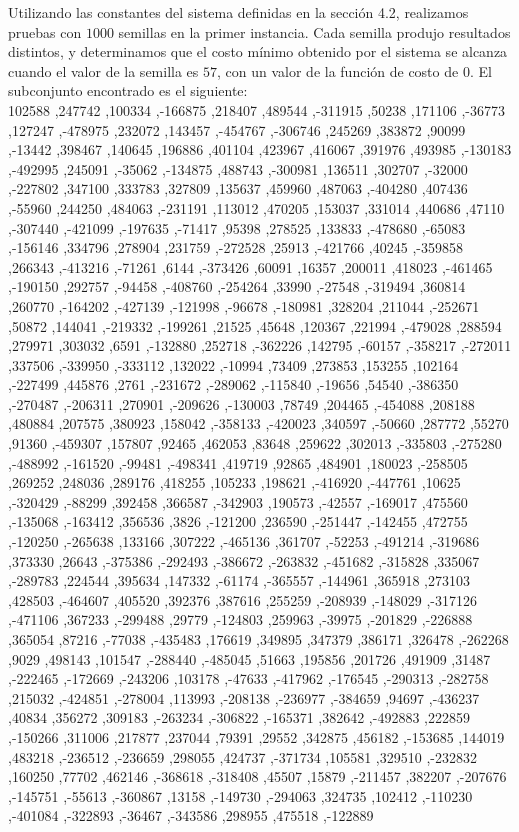 \documentclass[spanish,12pt,letterpaper]{article}
\begin{document}
	Utilizando las constantes del sistema definidas en la sección 4.2, realizamos pruebas con $1000$ semillas en la primer instancia. Cada semilla produjo resultados distintos, y determinamos que el costo mínimo obtenido por el sistema se alcanza cuando el valor de la semilla es $57$, con un valor de la función de costo de $0$. El subconjunto encontrado es el siguiente: \\
	
	102588 ,247742 ,100334 ,-166875 ,218407 ,489544 ,-311915 ,50238 ,171106 ,-36773 ,127247 ,-478975 ,232072 ,143457 ,-454767 ,-306746 ,245269 ,383872 ,90099 ,-13442 ,398467 ,140645 ,196886 ,401104 ,423967 ,416067 ,391976 ,493985 ,-130183 ,-492995 ,245091 ,-35062 ,-134875 ,488743 ,-300981 ,136511 ,302707 ,-32000 ,-227802 ,347100 ,333783 ,327809 ,135637 ,459960 ,487063 ,-404280 ,407436 ,-55960 ,244250 ,484063 ,-231191 ,113012 ,470205 ,153037 ,331014 ,440686 ,47110 ,-307440 ,-421099 ,-197635 ,-71417 ,95398 ,278525 ,133833 ,-478680 ,-65083 ,-156146 ,334796 ,278904 ,231759 ,-272528 ,25913 ,-421766 ,40245 ,-359858 ,266343 ,-413216 ,-71261 ,6144 ,-373426 ,60091 ,16357 ,200011 ,418023 ,-461465 ,-190150 ,292757 ,-94458 ,-408760 ,-254264 ,33990 ,-27548 ,-319494 ,360814 ,260770 ,-164202 ,-427139 ,-121998 ,-96678 ,-180981 ,328204 ,211044 ,-252671 ,50872 ,144041 ,-219332 ,-199261 ,21525 ,45648 ,120367 ,221994 ,-479028 ,288594 ,279971 ,303032 ,6591 ,-132880 ,252718 ,-362226 ,142795 ,-60157 ,-358217 ,-272011 ,337506 ,-339950 ,-333112 ,132022 ,-10994 ,73409 ,273853 ,153255 ,102164 ,-227499 ,445876 ,2761 ,-231672 ,-289062 ,-115840 ,-19656 ,54540 ,-386350 ,-270487 ,-206311 ,270901 ,-209626 ,-130003 ,78749 ,204465 ,-454088 ,208188 ,480884 ,207575 ,380923 ,158042 ,-358133 ,-420023 ,340597 ,-50660 ,287772 ,55270 ,91360 ,-459307 ,157807 ,92465 ,462053 ,83648 ,259622 ,302013 ,-335803 ,-275280 ,-488992 ,-161520 ,-99481 ,-498341 ,419719 ,92865 ,484901 ,180023 ,-258505 ,269252 ,248036 ,289176 ,418255 ,105233 ,198621 ,-416920 ,-447761 ,10625 ,-320429 ,-88299 ,392458 ,366587 ,-342903 ,190573 ,-42557 ,-169017 ,475560 ,-135068 ,-163412 ,356536 ,3826 ,-121200 ,236590 ,-251447 ,-142455 ,472755 ,-120250 ,-265638 ,133166 ,307222 ,-465136 ,361707 ,-52253 ,-491214 ,-319686 ,373330 ,26643 ,-375386 ,-292493 ,-386672 ,-263832 ,-451682 ,-315828 ,335067 ,-289783 ,224544 ,395634 ,147332 ,-61174 ,-365557 ,-144961 ,365918 ,273103 ,428503 ,-464607 ,405520 ,392376 ,387616 ,255259 ,-208939 ,-148029 ,-317126 ,-471106 ,367233 ,-299488 ,29779 ,-124803 ,259963 ,-39975 ,-201829 ,-226888 ,365054 ,87216 ,-77038 ,-435483 ,176619 ,349895 ,347379 ,386171 ,326478 ,-262268 ,9029 ,498143 ,101547 ,-288440 ,-485045 ,51663 ,195856 ,201726 ,491909 ,31487 ,-222465 ,-172669 ,-243206 ,103178 ,-47633 ,-417962 ,-176545 ,-290313 ,-282758 ,215032 ,-424851 ,-278004 ,113993 ,-208138 ,-236977 ,-384659 ,94697 ,-436237 ,40834 ,356272 ,309183 ,-263234 ,-306822 ,-165371 ,382642 ,-492883 ,222859 ,-150266 ,311006 ,217877 ,237044 ,79391 ,29552 ,342875 ,456182 ,-153685 ,144019 ,483218 ,-236512 ,-236659 ,298055 ,424737 ,-371734 ,105581 ,329510 ,-232832 ,160250 ,77702 ,462146 ,-368618 ,-318408 ,45507 ,15879 ,-211457 ,382207 ,-207676 ,-145751 ,-55613 ,-360867 ,13158 ,-149730 ,-294063 ,324735 ,102412 ,-110230 ,-401084 ,-322893 ,-36467 ,-343586 ,298955 ,475518 ,-122889 
\end{document}
